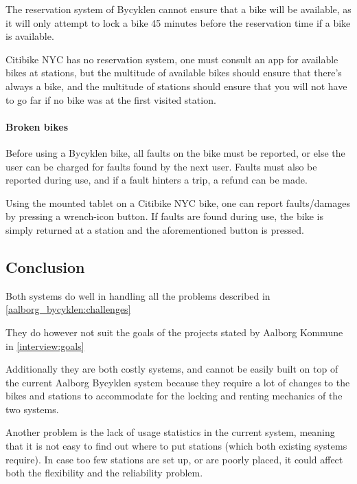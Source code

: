 The reservation system of Bycyklen cannot ensure that a bike will be available, as it will only attempt to lock a bike 45 minutes before the reservation time if a bike is available.

Citibike NYC has no reservation system, one must consult an app for available bikes at stations, but the multitude of  available bikes should ensure that there's always a bike, and the multitude of stations should ensure that you will not have to go far if no bike was at the first visited station.

\paragraph{Broken bikes}
Before using a Bycyklen bike, all faults on the bike must be reported, or else the user can be charged for faults found by the next user.
Faults must also be reported during use, and if a fault hinters a trip, a refund can be made.

Using the mounted tablet on a Citibike NYC bike, one can report faults/damages by pressing a wrench-icon button.
If faults are found during use, the bike is simply returned at a station and the aforementioned button is pressed.

\subsection{Conclusion}
Both systems do well in handling all the problems described in \cref{aalborg_bycyklen:challenges}

They do however not suit the goals of the projects stated by Aalborg Kommune in \cref{interview:goals}

Additionally they are both costly systems, and cannot be easily built on top of the current Aalborg Bycyklen system because they require a lot of changes to the bikes and stations to accommodate for the locking and renting mechanics of the two systems.

Another problem is the lack of usage statistics in the current system, meaning that it is not easy to find out where to put stations (which both existing systems require).
In case too few stations are set up, or are poorly placed, it could affect both the flexibility and the reliability problem.

